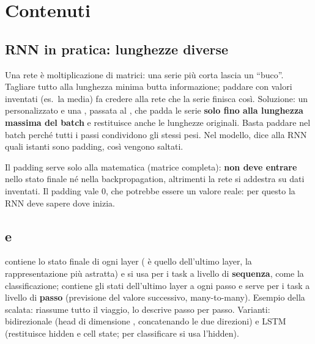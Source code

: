 \section{Contenuti}

\subsection{RNN in pratica: lunghezze diverse}
Una rete è moltiplicazione di matrici: una serie più corta lascia un ``buco''. Tagliare tutto alla
lunghezza minima butta informazione; paddare con valori inventati (es.\ la media) fa credere alla rete
che la serie finisca così. Soluzione: un  personalizzato e una ,
passata al , che padda le serie \textbf{solo fino alla lunghezza massima del
batch} e restituisce anche le lunghezze originali. Basta paddare nel batch perché tutti i passi
condividono gli stessi pesi. Nel modello,  dice alla RNN quali istanti
sono padding, così vengono saltati.

\begin{esame}
Il padding serve solo alla matematica (matrice completa): \textbf{non deve entrare} nello stato finale
né nella backpropagation, altrimenti la rete si addestra su dati inventati. Il padding vale 0, che
potrebbe essere un valore reale: per questo la RNN deve sapere dove inizia.
\end{esame}

\subsection{ e }
 contiene lo stato finale di ogni layer ( è quello dell'ultimo layer, la
rappresentazione più astratta) e si usa per i task a livello di \textbf{sequenza}, come la
classificazione;  contiene gli stati dell'ultimo layer a ogni passo e serve per i task a
livello di \textbf{passo} (previsione del valore successivo, many-to-many). Esempio della scalata:
 riassume tutto il viaggio,  lo descrive passo per passo. Varianti:
bidirezionale (head di dimensione , concatenando le due direzioni) e LSTM
(restituisce hidden e cell state; per classificare si usa l'hidden).


